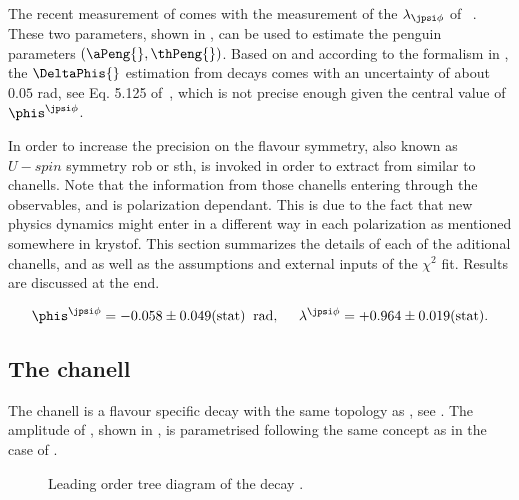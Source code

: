 

The recent \lhcb measurement of \phis comes with the measurement of the $\lambda_{\jpsi\phi}$ of ~\cite{phis-3fb-paper}.
These two parameters, shown in , can be used to estimate the penguin parameters $(\aPeng{},\thPeng{})$.
Based on  and according to the formalism in , the $\DeltaPhis{}$ estimation
from \BsJpsiPhi decays comes with an uncertainty of about $0.05$ rad, see Eq. 5.125 of~\cite{DeBruyn-thesis}, which is not precise
enough given the central value of $\phis^{\jpsi\phi}$.

In order to increase the precision on \DeltaPhis{} the \grpsuthree flavour symmetry, also known as $U-spin$ symmetry {\color{red} rob or sth},
is invoked in order to extract \DeltaPhis{} from similar to \BsJpsiPhi chanells.
Note that the information from those chanells entering through the observables,  and 
is polarization dependant. This is due to the fact that new physics dynamics might enter in a different way in each polarization as mentioned {\color{red}somewhere in krystof.}
This section summarizes the details of each of the aditional chanells, \BsJpsiKst and \BdJpsiRho as well as the assumptions and external inputs of the $\chi^2$ fit.
Results are discussed at the end.

\begin{equation}
  \centering
  \phis^{\jpsi\phi}     =  -0.058 \pm 0.049(\text{stat})  \;\; \text{rad}, \;\;\;\;\;
  \lambda^{\jpsi\phi}   =  +0.964 \pm 0.019(\text{stat}).
  \label{phis_lambda_result}
\end{equation}


\subsection{The \BsJpsiKst chanell}

The \BsJpsiKst chanell is a flavour specific decay with the same topology as \BsJpsiPhi, see .
The amplitude of \BsJpsiKst, shown in , is parametrised following the same concept as in the case of \BsJpsiPhi.

\begin{figure}[h]
  \centering
  {\sffamily }
  \caption{Leading order tree diagram of the decay \BsJpsiPhi.}
  \label{bs2jpsikst_tree}
\end{figure}

